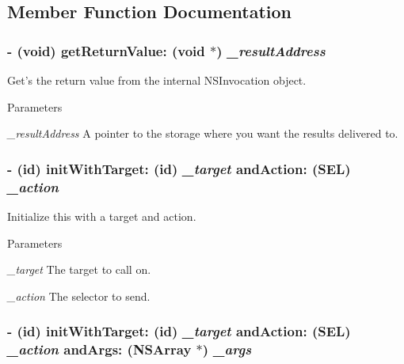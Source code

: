 \subsection{Member Function Documentation}
\hypertarget{interface_g_d_callback_ae28d4341944ea3135a41d16039bfc6f9}{
\subsubsection[{getReturnValue:}]{\setlength{\rightskip}{0pt plus 5cm}-\/ (void) getReturnValue: (void $\ast$) {\em \_\-resultAddress}}}
\label{interface_g_d_callback_ae28d4341944ea3135a41d16039bfc6f9}


Get's the return value from the internal NSInvocation object. 
\begin{DoxyParams}{Parameters}
\item[{\em \_\-resultAddress}]A pointer to the storage where you want the results delivered to. \end{DoxyParams}
\hypertarget{interface_g_d_callback_a7109227882adc61abf44c14e2b2064c4}{
\subsubsection[{initWithTarget:andAction:}]{\setlength{\rightskip}{0pt plus 5cm}-\/ (id) initWithTarget: (id) {\em \_\-target}\/ andAction: (SEL) {\em \_\-action}}}
\label{interface_g_d_callback_a7109227882adc61abf44c14e2b2064c4}


Initialize this with a target and action. 
\begin{DoxyParams}{Parameters}
\item[{\em \_\-target}]The target to call on. \item[{\em \_\-action}]The selector to send. \end{DoxyParams}
\hypertarget{interface_g_d_callback_a733709d0c0a9d9506a46a24b240ac51c}{
\subsubsection[{initWithTarget:andAction:andArgs:}]{\setlength{\rightskip}{0pt plus 5cm}-\/ (id) initWithTarget: (id) {\em \_\-target}\/ andAction: (SEL) {\em \_\-action}\/ andArgs: (NSArray $\ast$) {\em \_\-args}}}
\label{interface_g_d_callback_a733709d0c0a9d9506a46a24b240ac51c}


